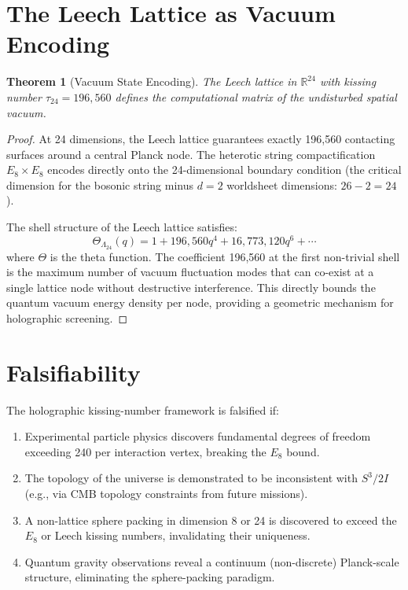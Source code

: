\documentclass[12pt, a4paper]{article}
\theoremstyle{plain}
\newtheorem{theorem}{Theorem}[section]
\theoremstyle{definition}
\begin{document}
\section{The Leech Lattice as Vacuum Encoding}\label{sec:leech}

\begin{theorem}[Vacuum State Encoding]
The Leech lattice in $\mathbb{R}^{24}$ with kissing number $\tau_{24} = 196{,}560$ defines the computational matrix of the undisturbed spatial vacuum.
\end{theorem}

\begin{proof}
At 24 dimensions, the Leech lattice guarantees exactly 196,560 contacting surfaces around a central Planck node. The heterotic string compactification $E_8 \times E_8$ encodes directly onto the 24-dimensional boundary condition (the critical dimension for the bosonic string minus $d=2$ worldsheet dimensions: $26-2=24$).

The shell structure of the Leech lattice satisfies:
\begin{equation}
    \Theta_{\Lambda_{24}}(q) = 1 + 196{,}560 q^4 + 16{,}773{,}120 q^6 + \cdots
\end{equation}
where $\Theta$ is the theta function. The coefficient 196,560 at the first non-trivial shell is the maximum number of vacuum fluctuation modes that can co-exist at a single lattice node without destructive interference. This directly bounds the quantum vacuum energy density per node, providing a geometric mechanism for holographic screening.
\end{proof}

\section{Falsifiability}\label{sec:falsifiability}

\begin{proposition}
The holographic kissing-number framework is falsified if:
\begin{enumerate}
    \item Experimental particle physics discovers fundamental degrees of freedom exceeding 240 per interaction vertex, breaking the $E_8$ bound.
    \item The topology of the universe is demonstrated to be inconsistent with $S^3/2I$ (e.g., via CMB topology constraints from future missions).
    \item A non-lattice sphere packing in dimension 8 or 24 is discovered to exceed the $E_8$ or Leech kissing numbers, invalidating their uniqueness.
    \item Quantum gravity observations reveal a continuum (non-discrete) Planck-scale structure, eliminating the sphere-packing paradigm.
\end{enumerate}
\end{proposition}
\end{document}
